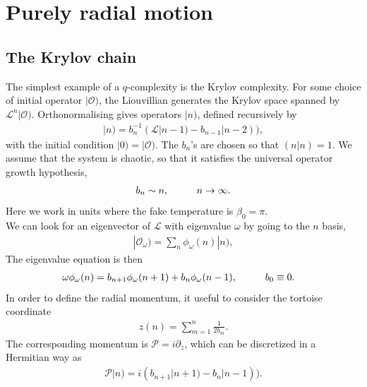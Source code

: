 \documentclass[JHEP,12pt]{article}
\begin{document}
\section{Purely radial motion}
\subsection{The Krylov chain}
The simplest example of a $q$-complexity is the Krylov complexity. For some choice of initial operator $|\mathcal{O})$, the Liouvillian generates the Krylov space spanned by $\mathcal{L}^n |\mathcal{O})$. Orthonormalising gives operators $|n)$, defined recursively by 
\begin{align}
|n)=b_n^{-1}(\mathcal{L}|n-1)-b_{n-1}|n-2)),
\end{align}with the initial condition $|0)=|\mathcal{O})$. The $b_n$'s are chosen so that $(n|n)=1$. We assume that the system is chaotic, so that it satisfies the universal operator growth hypothesis, 
\begin{align}
b_n\sim n,\hspace{10 mm}n\to \infty.
\end{align}
Here we work in units where the fake temperature is $\beta_0=\pi$.\\
\indent We can look for an eigenvector of $\mathcal{L}$ with eigenvalue $\omega$ by going to the $n$ basis, 
\begin{align}
|\mathcal{O}_\omega)=\sum_n \phi_\omega(n)|n),
\end{align}
The eigenvalue equation is then
\begin{align}
\omega\phi_\omega(n)&=b_{n+1}\phi_\omega(n+1)+b_n \phi_\omega(n-1),\hspace{10 mm}b_0\equiv 0.
\end{align}
In order to define the radial momentum, it useful to consider the tortoise coordinate
\begin{align}
z(n)=\sum_{m=1}^{n}\frac{1}{2b_m}.
\end{align}
The corresponding momentum is $\mathcal{P}=i\partial_z$, which can be discretized in a Hermitian way as
\begin{align}
\mathcal{P}|n)=i(b_{n+1}|n+1)-b_{n}|n-1)).
\end{align}
\end{document}
